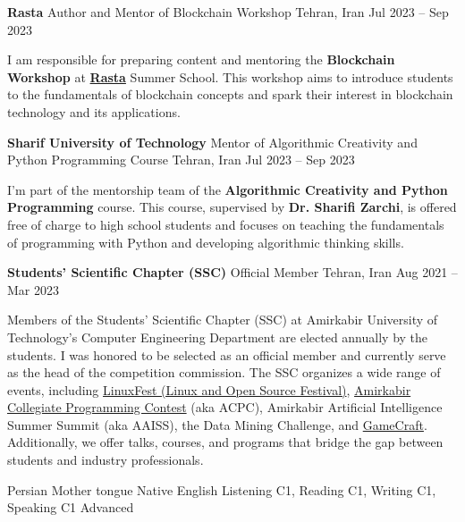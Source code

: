 \documentclass[]{awesome-cv}
\begin{document}
\begin{cventries}
	\cventry
	{\textbf{Rasta}}
	{Author and Mentor of Blockchain Workshop}
	{Tehran, Iran}
	{Jul 2023 – Sep 2023}
	{\begin{cvitems}
		\vspace{1mm}
		\item[] {I am responsible for preparing content and mentoring the \textbf{Blockchain Workshop} at \href{https://rastaiha.ir/}{\textcolor{awesome}{\textbf{Rasta}}} Summer School. This workshop aims to introduce students to the fundamentals of blockchain concepts and spark their interest in blockchain technology and its applications.}
	\end{cvitems}}
	\cventry
	{\textbf{Sharif University of Technology}}
	{Mentor of Algorithmic Creativity and Python Programming Course}
	{Tehran, Iran}
	{Jul 2023 – Sep 2023}
	{\begin{cvitems}
		\vspace{1mm}
		\item[] {I'm part of the mentorship team of the \textbf{Algorithmic Creativity and Python Programming} course. This course, supervised by \textbf{Dr. Sharifi Zarchi}, is offered free of charge to high school students and focuses on teaching the fundamentals of programming with Python and developing algorithmic thinking skills.}
	\end{cvitems}}
	\cventry
	{\textbf{Students'​ Scientific Chapter (SSC)}}
	{Official Member}
	{Tehran, Iran}
	{Aug 2021 – Mar 2023}
	{\begin{cvitems}
		\vspace{1mm}
		\item[] {Members of the Students' Scientific Chapter (SSC) at Amirkabir University of Technology's Computer Engineering Department are elected annually by the students. I was honored to be selected as an official member and currently serve as the head of the competition commission. The SSC organizes a wide range of events, including \href{http://linuxfest.aut.ac.ir/}{\textcolor{awesome}{LinuxFest (Linux and Open Source Festival)}}, \href{https://icpc.aut.ac.ir/}{\textcolor{awesome}{Amirkabir Collegiate Programming Contest}} (aka ACPC), Amirkabir Artificial Intelligence Summer Summit (aka AAISS), the Data Mining Challenge, and \href{https://gamecraft.ce.aut.ac.ir/}{\textcolor{awesome}{GameCraft}}. Additionally, we offer talks, courses, and programs that bridge the gap between students and industry professionals.}
	\end{cvitems}}
\end{cventries}
\begin{cvhonors}
	\cvhonor
	{Persian}
	{Mother tongue}
	{}
	{Native}
	\cvhonor
	{English}
	{Listening C1, Reading C1, Writing C1, Speaking C1}
	{}
	{Advanced}
\end{cvhonors}
\ 
\end{document}

